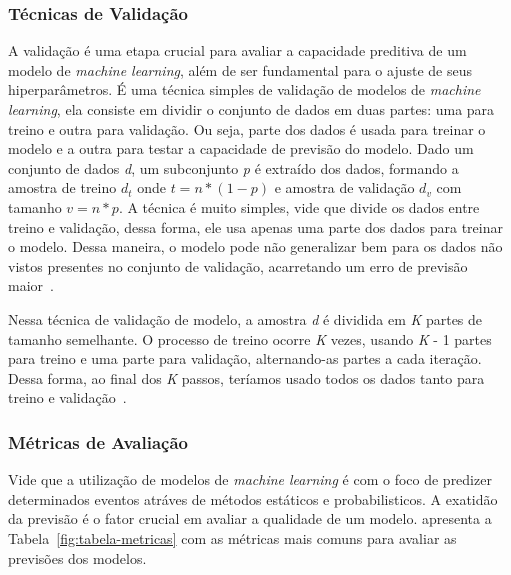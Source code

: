         \subsubsection{Técnicas de Validação}
        A validação é uma etapa crucial para avaliar a capacidade preditiva de um modelo de 
        \emph{machine learning}, além de ser fundamental para o ajuste de seus hiperparâmetros.
            É uma técnica simples de validação de modelos de \emph{machine learning}, ela consiste em dividir
            o conjunto de dados em duas partes: uma para treino e outra para validação. Ou seja, parte dos 
            dados é usada para treinar o modelo e a outra para testar a capacidade de previsão do modelo. 
            Dado um conjunto de dados \emph{d}, um subconjunto \emph{p} é extraído dos dados, formando 
            a amostra de treino \(d_t\) onde \(t = n * (1 - p)\) e amostra de validação \(d_v\) com tamanho
            \(v = n * p\). 
            A técnica é muito simples, vide que divide os dados entre treino e validação, dessa forma, ele
            usa apenas uma parte dos dados para treinar o modelo. Dessa maneira, o modelo pode não generalizar
            bem para os dados não vistos presentes no conjunto de validação, acarretando um erro de previsão
            maior~\cite{cunha2019}.

            Nessa técnica de validação de modelo, a amostra \emph{d} é dividida em \emph{K} partes de tamanho
            semelhante. O processo de treino ocorre \emph{K} vezes, usando \emph{K} - 1 partes para treino e
            uma parte para validação, alternando-as partes a cada iteração. Dessa forma, ao final dos \emph{K}
            passos, teríamos usado todos os dados tanto para treino e validação~\cite{cunha2019}.
        \subsubsection{Métricas de Avaliação}
            Vide que a utilização de modelos de \emph{machine learning} é com o foco de predizer determinados eventos atráves
            de métodos estáticos e probabilisticos. A exatidão da previsão é o fator crucial em avaliar a qualidade de um modelo.
             apresenta a Tabela~\ref{fig:tabela-metricas} com as métricas mais comuns para avaliar as previsões
            dos modelos.
            
